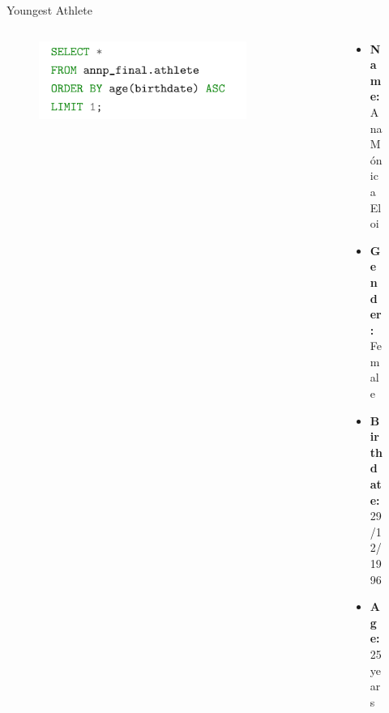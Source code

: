 \documentclass[aspectratio=169, xcolor=dvipsnames]{beamer}
\begin{document}
\begin{frame}{Youngest Athlete}
\begin{columns}[c]
\begin{column}{.5\textwidth}
\begin{figure}
    \centering
    \includegraphics[width=0.9\textwidth]{img/sql/youngest.png}
\end{figure}
\end{column}

\begin{column}{.5\textwidth}
\begin{figure}
\begin{itemize}
    \item \textbf{Name:} Ana Mónica Eloi
    \item \textbf{Gender:} Female
    \item \textbf{Birthdate:} 29/12/1996
    \item \textbf{Age:} 25 years
\end{itemize}
\end{figure}
\end{column}
\end{columns}
\end{frame}
\end{document}
